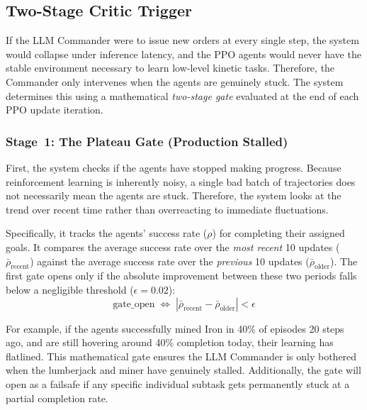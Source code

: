 \subsection{Two-Stage Critic Trigger}
\label{sec:critic_trigger}

If the LLM Commander were to issue new orders at every single step, the system would collapse under inference latency, and the PPO agents would never have the stable environment necessary to learn low-level kinetic tasks. Therefore, the Commander only intervenes when the agents are genuinely stuck. The system determines this using a mathematical \emph{two-stage gate} evaluated at the end of each PPO update iteration.

\subsubsection{Stage~1: The Plateau Gate (Production Stalled)}

First, the system checks if the agents have stopped making progress. Because reinforcement learning is inherently noisy, a single bad batch of trajectories does not necessarily mean the agents are stuck. Therefore, the system looks at the trend over recent time rather than overreacting to immediate fluctuations. 

Specifically, it tracks the agents' success rate ($\rho$) for completing their assigned goals. It compares the average success rate over the \emph{most recent} 10 updates ($\bar{\rho}_{\text{recent}}$) against the average success rate over the \emph{previous} 10 updates ($\bar{\rho}_{\text{older}}$). The first gate opens only if the absolute improvement between these two periods falls below a negligible threshold ($\epsilon = 0.02$):
\begin{equation}
\label{eq:plateau_gate}
    \text{gate\_open} \;\Longleftrightarrow\; \left| \bar{\rho}_{\text{recent}} - \bar{\rho}_{\text{older}} \right| < \epsilon
\end{equation}

For example, if the agents successfully mined Iron in 40\% of episodes 20 steps ago, and are still hovering around 40\% completion today, their learning has flatlined. This mathematical gate ensures the LLM Commander is only bothered when the lumberjack and miner have genuinely stalled. Additionally, the gate will open as a failsafe if any specific individual subtask gets permanently stuck at a partial completion rate.

